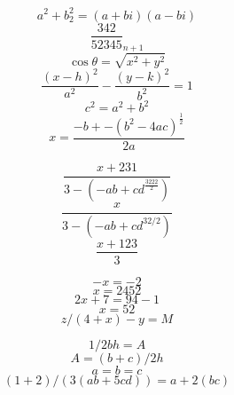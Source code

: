 \documentclass{article}
\begin{document}
\[ a^2+b_2^2 = (a+bi)(a-bi) \]
\[ \frac{342}{52345}_{n+1} \]
\[ \cos\theta = \sqrt{x^2 + y^2} \]
\[ \frac{(x-h)^2}{a^2} - \frac{(y-k)^2}{b^2} = 1\]
\[ c^2 = a^2 + b^2 \]
\[ x = \frac{-b+-(b^2-4ac)^{\frac{1}{2}}}{2a} \]

\[ \frac{x+231}{3-(-ab + cd^\frac{3222}{2})} \]
\[ \frac{x}{3-(-ab + cd^{32/2})} \]
\[ \frac{x+123}{3} \]

\[ -x = -2 \]
\[ x=2452 \] 
\[ 2x + 7 = 94 - 1 \] 
\[ x = 52 \] 
\[ z/(4 + x) - y = M \]

\[ 1/2bh = A \]
\[ A = (b+c)/2h \]
\[ a=b=c \]
\[ (1+2)/(3(ab+5cd))=a+2(bc) \]
\end{document}
